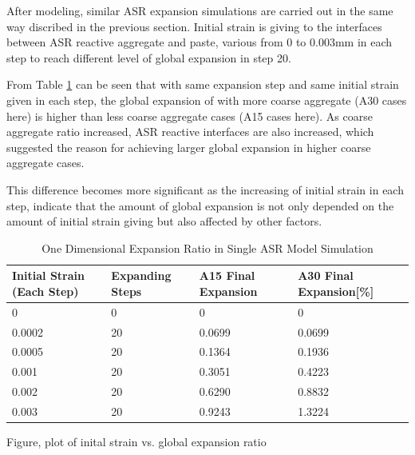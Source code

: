 After modeling, similar ASR expansion simulations are carried out in the same way discribed in the previous section. Initial strain is giving to the interfaces between ASR reactive aggregate and paste, various from 0 to 0.003mm in each step to reach different level of global expansion in step 20.


From Table \ref{table:ASR_15vs30_EXP} can be seen that with same expansion step and same initial strain given in each step, the global expansion of with more coarse aggregate (A30 cases here) is higher than less coarse aggregate cases (A15 cases here).  As coarse aggregate ratio increased, ASR reactive interfaces are also increased, which suggested the reason for achieving larger global expansion in higher coarse aggregate cases.

This difference becomes more significant as the increasing of initial strain in each step, indicate that the amount of global expansion is not only depended on the amount of initial strain giving but also affected by other factors.


\begin{table}[ht!]
\centering
\begin{tabular}{ ||p{2cm}|p{2cm}|p{2cm}|p{2cm}|| }
 \hline
    Initial Strain (Each Step) & Expanding Steps & A15 Final Expansion & A30 Final Expansion[\%] \\ [0.5ex]
 \hline\hline
  0 & 0 & 0 & 0 \\
  0.0002 & 20 & 0.0699 & 0.0699\\
  0.0005 & 20 & 0.1364 & 0.1936\\
  0.001 & 20 & 0.3051 & 0.4223\\
  0.002 & 20 & 0.6290 & 0.8832\\
  0.003 & 20 & 0.9243 & 1.3224\\
 \hline
\end{tabular}
\caption{One Dimensional Expansion Ratio in Single ASR Model Simulation}
\label{table:ASR_15vs30_EXP}
\end{table}

Figure, plot of inital strain vs. global expansion ratio

